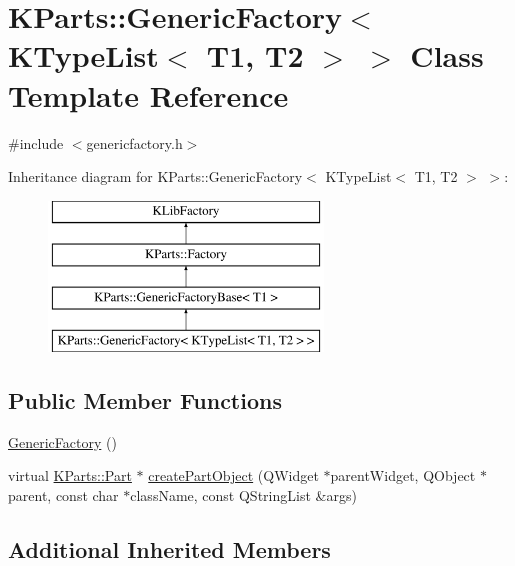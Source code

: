 \hypertarget{classKParts_1_1GenericFactory_3_01KTypeList_3_01T1_00_01T2_01_4_01_4}{\section{K\+Parts\+:\+:Generic\+Factory$<$ K\+Type\+List$<$ T1, T2 $>$ $>$ Class Template Reference}
\label{classKParts_1_1GenericFactory_3_01KTypeList_3_01T1_00_01T2_01_4_01_4}
}


{\ttfamily \#include $<$genericfactory.\+h$>$}

Inheritance diagram for K\+Parts\+:\+:Generic\+Factory$<$ K\+Type\+List$<$ T1, T2 $>$ $>$\+:\begin{figure}[H]
\begin{center}
\leavevmode
\includegraphics[height=4.000000cm]{classKParts_1_1GenericFactory_3_01KTypeList_3_01T1_00_01T2_01_4_01_4}
\end{center}
\end{figure}
\subsection*{Public Member Functions}
\begin{DoxyCompactItemize}
\item 
\hyperlink{classKParts_1_1GenericFactory_3_01KTypeList_3_01T1_00_01T2_01_4_01_4_addfaf3065f16712d09a7a63bee3fd116}{Generic\+Factory} ()
\item 
virtual \hyperlink{classKParts_1_1Part}{K\+Parts\+::\+Part} $\ast$ \hyperlink{classKParts_1_1GenericFactory_3_01KTypeList_3_01T1_00_01T2_01_4_01_4_aa3e8c27c10a09306951a2e63159a3d56}{create\+Part\+Object} (Q\+Widget $\ast$parent\+Widget, Q\+Object $\ast$parent, const char $\ast$class\+Name, const Q\+String\+List \&args)
\end{DoxyCompactItemize}
\subsection*{Additional Inherited Members}


